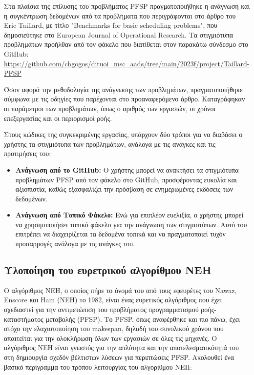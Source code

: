 \documentclass[paper=a4, fontsize=11pt]{scrartcl}
\numberwithin{equation}{section}		%
\numberwithin{figure}{section}			%
\numberwithin{table}{section}				%
\begin{document}
    Στα πλαίσια της επίλυσης του προβλήματος PFSP πραγματοποιήθηκε η ανάγνωση και η συγκέντρωση δεδομένων από τα προβλήματα που περιγράφονται στο άρθρο του Eric Taillard, με τίτλο "Benchmarks for basic scheduling problems", που δημοσιεύτηκε στο European Journal of Operational Research.
    Τα στιγμιότυπα προβλημάτων προήλθαν από τον φάκελο που διατίθεται στον παρακάτω σύνδεσμο στο GitHub: \url{https://github.com/chgogos/dituoi_msc_aads/tree/main/2023f/project/Taillard-PFSP}

    Όσον αφορά την μεθοδολογία της ανάγνωσης των προβλημάτων, πραγματοποιήθηκε σύμφωνα με τις οδηγίες που παρέχονται στο προαναφερόμενο άρθρο. Καταγράφηκαν οι παράμετροι των προβλημάτων, όπως ο αριθμός των εργασιών, οι χρόνοι επεξεργασίας και οι περιορισμοί ροής.
    
    Στους κώδικες της συγκεκριμένης εργασίας, υπάρχουν δύο τρόποι για να διαβάσει ο χρήστης τα στιγμιότυπα των προβλημάτων, ανάλογα με τις ανάγκες και τις προτιμήσεις του:

\begin{itemize}
  \item \textbf{Ανάγνωση από το GitHub:} Ο χρήστης μπορεί να ανακτήσει τα στιγμιότυπα προβλημάτων PFSP από τον φάκελο στο GitHub, προσφέροντας ευκολία και αξιοπιστία, καθώς εξασφαλίζει την πρόσβαση σε ενημερωμένες εκδόσεις των δεδομένων.  
  \item \textbf{Ανάγνωση από Τοπικό Φάκελο:} Ενώ για επιπλέον ευελιξία, ο χρήστης μπορεί να χρησιμοποιήσει τοπικό φάκελο για την ανάγνωση των στιγμιοτύπων. Αυτό του επιτρέπει να διαχειρίζεται τα δεδομένα τοπικά και να πραγματοποιεί τυχόν προσαρμογές ανάλογα με τις ανάγκες του.
\end{itemize}

\newpage
\subsection{Υλοποίηση του ευρετρικού αλγορίθμου NEH}

    Ο αλγόριθμος NEH, ο οποίος πήρε το όνομά του από τους εφευρέτες του Nawaz, Enscore και Ham (NEH) το 1982, είναι ένας ευρετικός αλγόριθμος που έχει σχεδιαστεί για την αντιμετώπιση του προβλήματος προγραμματισμού ροής-καταστήματος μεταβολής (PFSP). Το PFSP, όπως αναφέρθηκε και πιο πάνω, έχει στόχο την ελαχιστοποίηση του makespan, δηλαδή του συνολικού χρόνου που απαιτείται για την ολοκλήρωση όλων των εργασιών σε όλες τις μηχανές. Ο αλγόριθμος NEH είναι γνωστός για την απλότητα και την αποτελεσματικότητά του στη δημιουργία σχεδόν βέλτιστων λύσεων για περιπτώσεις PFSP. Ακολουθεί ένα βασικό περίγραμμα του τρόπου λειτουργίας του αλγορίθμου NEH:
\end{document}
